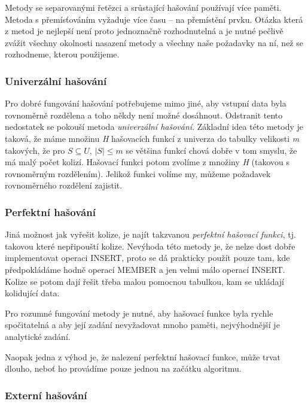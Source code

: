 \begin{poznamka} Metody se separovanými řetězci a srůstající hašování používají
více paměti. Metoda s přemísťováním vyžaduje více času -- na přemístění prvku.
Otázka která z metod je nejlepší není proto jednoznačně rozhodnutelná a je nutné
pečlivě zvážit všechny okolnosti nasazení metody a všechny naše požadavky na ní,
než se rozhodneme, kterou použijeme.
\end{poznamka}

\subsubsection*{Univerzální hašování}

Pro dobré fungování hašování potřebujeme mimo jiné, aby vstupní data byla
rovnoměrně rozdělena a toho někdy není možné dosáhnout. Odstranit tento
nedostatek se pokouší metoda \emph{univerzální hašování}. Základní idea této
metody je taková, že máme množinu \emph{H} hašovacích funkcí z univerza do
tabulky velikosti \emph{m} takových, že pro $S \subseteq U$, $|S| \leq m$ se
většina funkcí chová dobře v tom smyslu, že má malý počet kolizí. Hašovací
funkci potom zvolíme z množiny \emph{H} (takovou s rovnoměrným rozdělením).
Jelikož funkci volíme my, můžeme požadavek rovnoměrného rozdělení zajistit.

\subsubsection*{Perfektní hašování}

Jiná možnost jak vyřešit kolize, je najít takzvanou \emph{perfektní hašovací
funkci}, tj. takovou které nepřipouští kolize. Nevýhoda této metody je, že nelze
dost dobře implementovat operaci INSERT, proto se dá prakticky použít pouze tam,
kde předpokládáme hodně operací MEMBER a jen velmi málo operací INSERT. Kolize
se potom dají řešit třeba malou pomocnou tabulkou, kam se ukládají kolidující
data. 

Pro rozumné fungování metody je nutné, aby hašovací funkce byla rychle
spočitatelná a aby její zadání nevyžadovat mnoho paměti, nejvýhodnější je
analytické zadání. 

Naopak jedna z výhod je, že nalezení perfektní hašovací funkce, může trvat
dlouho, neboť ho provádíme pouze jednou na začátku algoritmu. 

\subsubsection*{Externí hašování}

